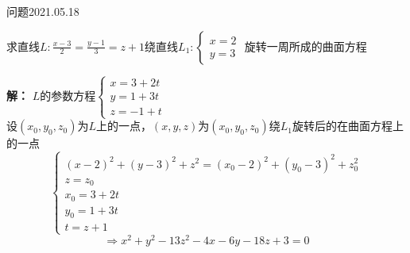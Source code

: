 \begin{mybox}{问题2021.05.18}
	
	\qquad 求直线$L: \frac{x-3}{2} = \frac{y-1}{3} = z+1$绕直线$L_{1}:\begin{cases} 
	x=2\\
	y=3		
	\end{cases}$ 旋转一周所成的曲面方程
\end{mybox}
\noindent
\textbf{解：}
$L$的参数方程$\begin{cases}
x=3+2t\\
y=1+3t\\
z=-1+t
\end{cases}$\\
设$(x_{0},y_{0},z_{0})$为$L$上的一点，$(x,y,z)$为$(x_{0},y_{0},z_{0})$绕$L_{1}$旋转后的在曲面方程上的一点
$$\begin{cases}
(x-2)^2+(y-3)^2+z^2=(x_{0}-2)^2+(y_{0}-3)^2+z_{0}^2\\
z=z_{0}\\
x_{0}=3+2t\\
y_{0}=1+3t\\
t=z+1

\end{cases}$$
$$\Rightarrow x^2+y^2-13z^2-4x-6y-18z+3=0$$